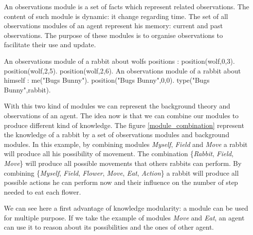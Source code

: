 \documentclass{aamas2012}
\begin{document}
	\begin{definition}
		An observations module is a set of facts which represent related observations.
		The content of such module is dynamic: it change regarding time.
		The set of all observations modules of an agent represent his memory: current and past observations.
		The purpose of these modules is to organise observations to facilitate their use and update.
	\end{definition}
	
	\begin{example}
		An observations module of a rabbit about wolfs positions :\newline
		\newline
		position(wolf,0,3).\newline
		position(wolf,2,5).\newline
		position(wolf,2,6).\newline
		\newline
		An observations module of a rabbit about himself : \newline
		\newline
		me("Bugs Bunny").\newline
		position("Bugs Bunny",0,0).\newline
		type("Bugs Bunny",rabbit).\newline
	\end{example}

	With this two kind of modules we can represent the background theory and observations of an agent.
	The idea now is that we can combine our modules to produce different kind of knowledge.
	The figure \ref{module_combination} represent the knowledge of a rabbit by a set of observations modules and background modules.
	In this example, by combining modules \emph{Myself}, \emph{Field} and \emph{Move} a rabbit will produce all his possibility of movement.
	The combination \{\emph{Rabbit}, \emph{Field}, \emph{Move}\} will produce all possible movements that others rabbits can perform. 
	By combining \{\emph{Myself}, \emph{Field}, \emph{Flower}, \emph{Move}, \emph{Eat}, \emph{Action}\} 
	a rabbit will produce all possible actions he can perform now and their influence on the number of step needed to eat each flower.
	
	We can see here a first advantage of knowledge modularity: a module can be used for multiple purpose.
	If we take the example of modules \emph{Move} and \emph{Eat}, an agent can use it to reason about its possibilities and the ones of other agent.
	
\end{document}
